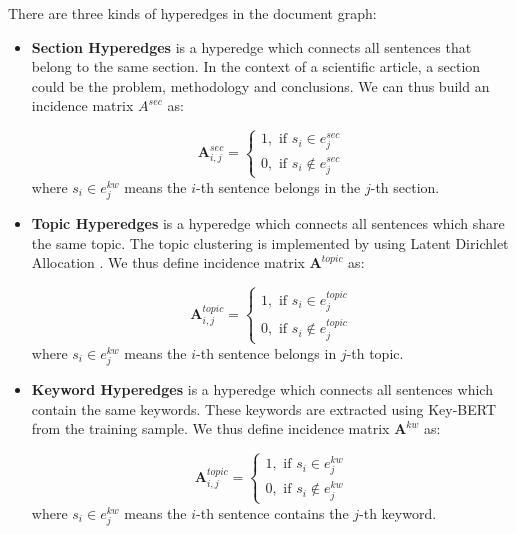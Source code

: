 \documentclass[preprint,review,12pt]{elsarticle}
\begin{document}
There are three kinds of hyperedges in the document graph:
\begin{itemize}
    \item \textbf{Section Hyperedges} is a hyperedge which connects all sentences that belong to the same section. In the context of a scientific article, a section could be the problem, methodology and conclusions. We can thus build an incidence matrix $A^{sec}$ as:

    \begin{equation}
     \mathbf{A}^{sec}_{i,j} =
      \begin{cases}
          1, \text{ if } s_{i} \in e^{sec}_{j} \\
          0, \text{ if } s_{i} \notin e^{sec}_{j}
      \end{cases}
    \end{equation}
    where $s_{i} \in e^{kw}_{j}$ means the $i$-th sentence belongs in the $j$-th section.

    \item \textbf{Topic Hyperedges} is a hyperedge which connects all sentences which share the same topic. The topic clustering is implemented by using Latent Dirichlet Allocation \cite{dirichet}. We thus define incidence matrix
    $\mathbf{A}^{topic}$ as:
    
     \begin{equation}
     \mathbf{A}^{topic}_{i,j} =
      \begin{cases}
          1, \text{ if } s_{i} \in e^{topic}_{j} \\
          0, \text{ if } s_{i} \notin e^{topic}_{j}
      \end{cases}
    \end{equation}
    where $s_{i} \in e^{kw}_{j}$ means the $i$-th sentence belongs in $j$-th topic.

    \item \textbf{Keyword Hyperedges} is a hyperedge which connects all sentences which contain the same keywords. These keywords are extracted using Key-BERT \cite{keybert} from the training sample. We thus define incidence matrix $\mathbf{A}^{kw}$ as:

    \begin{equation}
     \mathbf{A}^{topic}_{i,j} =
      \begin{cases}
          1, \text{ if } s_{i} \in e^{kw}_{j} \\
          0, \text{ if } s_{i} \notin e^{kw}_{j}
      \end{cases}
    \end{equation}
    where $s_{i} \in e^{kw}_{j}$ means the $i$-th sentence contains the $j$-th keyword.
\end{itemize}
\end{document}
